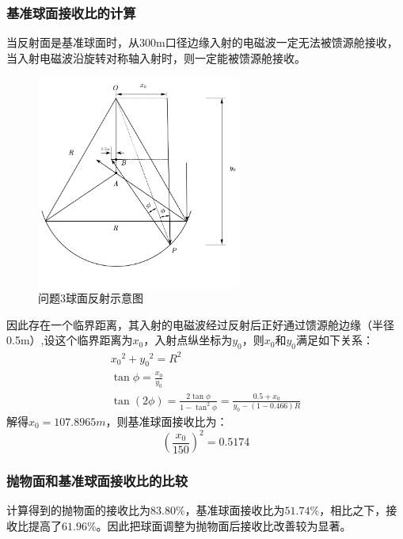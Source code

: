 \documentclass[withoutpreface,bwprint]{cumcmthesis} %
\begin{document}
	\subsubsection{基准球面接收比的计算}
	当反射面是基准球面时，从300m口径边缘入射的电磁波一定无法被馈源舱接收，当入射电磁波沿旋转对称轴入射时，则一定能被馈源舱接收。
					\begin{figure}[!htp]
		\centering
		\includegraphics[width=0.6\textwidth]{问题3球面反射示意图}
		\caption{问题3球面反射示意图}
		\label{问题3球面反射示意图}
	\end{figure}

	因此存在一个临界距离，其入射的电磁波经过反射后正好通过馈源舱边缘（半径0.5m）,设这个临界距离为$x_0$，入射点纵坐标为$y_0$，则$x_0$和$y_0$满足如下关系：
	\begin{equation}
	\begin{gathered}
	x_{0}{ }^{2}+y_{0}{ }^{2}=R^{2} \\
	\tan \phi=\frac{x_{0}}{y_{0}} \\
	\tan (2 \phi)=\frac{2 \tan \phi}{1-\tan ^{2} \phi}=\frac{0.5+x_{0}}{y_{0}-(1-0.466) R}
	\end{gathered}
	\end{equation}
	解得$x_0=107.8965m$，则基准球面接收比为：
	\begin{equation}
	\left(\frac{x_{0}}{150}\right)^{2}=0.5174
	\end{equation}
	
	\subsubsection{抛物面和基准球面接收比的比较}
	计算得到的抛物面的接收比为$83.80\%$，基准球面接收比为$51.74\%$，相比之下，接收比提高了$61.96\%$。因此把球面调整为抛物面后接收比改善较为显著。
	
\end{document}
